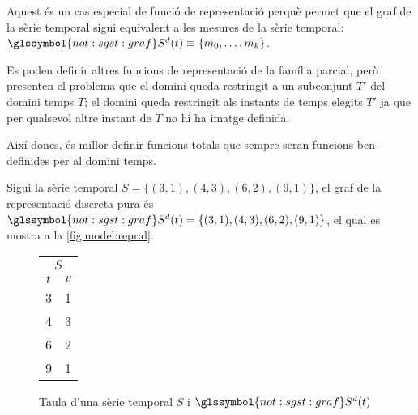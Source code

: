 Aquest és un cas especial de funció de representació perquè permet que
el graf de la sèrie temporal sigui equivalent a les mesures de la
sèrie temporal: $\glssymbol{not:sgst:graf} S^d(t) \equiv
\{m_0,\ldots,m_k\}$.

Es poden definir altres funcions de representació de la família
parcial, però presenten el problema que el domini queda restringit a
un subconjunt $T'$ del domini temps $T$; el domini queda restringit
als instants de temps elegits $T'$ ja que per qualsevol altre instant de
$T$ no hi ha imatge definida.

Així doncs, és millor definir funcions totals que sempre seran
funcions ben-definides per al domini temps.



\begin{example}
  Sigui la sèrie temporal $S=\{ (3,1), (4,3), (6,2), (9,1) \}$, el
  graf de la representació discreta pura és $\glssymbol{not:sgst:graf}
  S^d(t)=\{ (3,1), (4,3), (6,2), (9,1) \}$, el qual es mostra a la
  \autoref{fig:model:repr:d}.


  \begin{figure}[tp]
  \centering
  \begin{tabular}[c]{|c|c|}
    \multicolumn{2}{c}{$S$} \\ \hline
    $t$  & $v$ \\ \hline
    3  & 1 \\
    4  & 3 \\
    6  & 2 \\
    9  & 1 \\ \hline
  \end{tabular} \qquad
   \caption{Taula d'una sèrie temporal $S$ i
     $\glssymbol{not:sgst:graf} S^d(t)$}
  \label{fig:model:repr:d}
  \end{figure}
\end{example}




